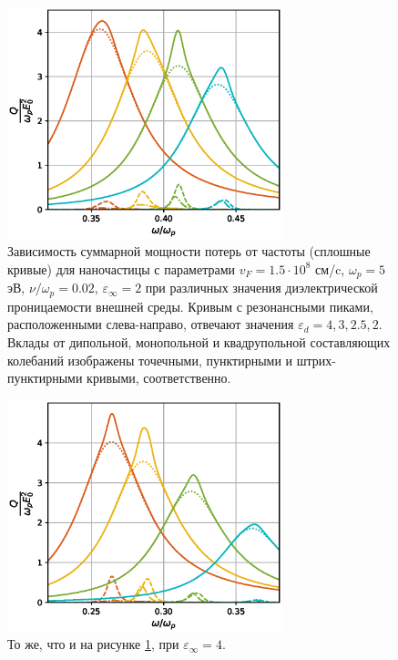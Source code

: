 \documentclass[12pt, a4paper]{article}
\def \eps {\varepsilon}
\def \w {\omega}
\begin{document}
\begin{figure}[h]
	\centering
	\includegraphics[width=80mm]{./image/fig1_epsd2.eps}
	\caption{Зависимость суммарной мощности потерь от частоты (сплошные кривые) для наночастицы с параметрами $v_F = 1.5 \cdot 10^8$ см/c, $\w_p = 5$ эВ, $\nu / \w_p = 0.02$,  $\eps_\infty= 2$ при различных значения диэлектрической проницаемости внешней среды. Кривым с резонансными пиками, расположенными слева-направо, отвечают значения $\eps_d = 4, 3, 2.5, 2$. Вклады от дипольной, монопольной и квадрупольной составляющих колебаний изображены точечными, пунктирными и штрих-пунктирными кривыми, соответственно.}
	\label{fig1_epsd2}
\end{figure} 
\newpage
\begin{figure}[h]
	\centering
	\includegraphics[width=80mm]{./image/fig1_epsd4.eps}
	\caption{ То же, что и на рисунке \ref{fig1_epsd2}, при $\eps_\infty= 4$.}
	\label{fig1_epsd4}
\end{figure} 
\newpage
\end{document}
